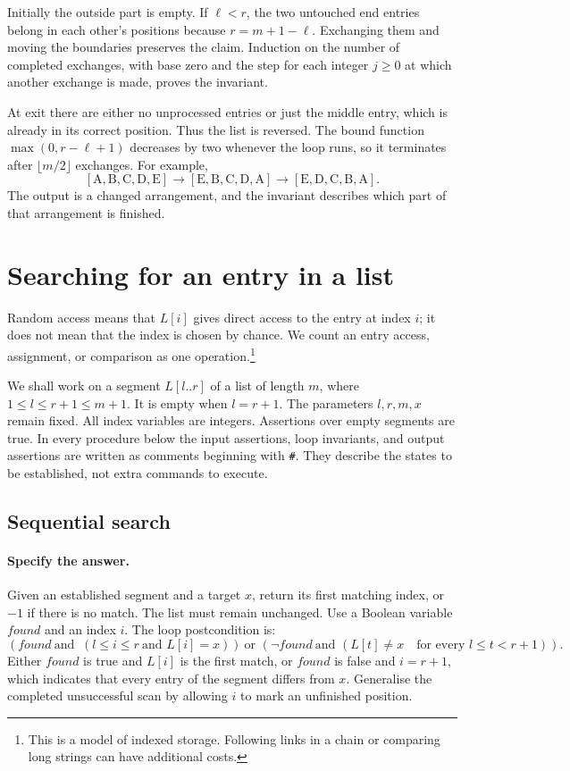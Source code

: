 Initially the outside part is empty. If $\ell<r$, the two untouched
end entries belong in each other's positions because $r=m+1-\ell$.
Exchanging them and moving the boundaries preserves the claim. Induction
on the number of completed exchanges, with base zero and the step for each
integer $j\geq0$ at which another exchange is made, proves the invariant.

At exit there are either no unprocessed entries or just the middle entry,
which is already in its correct position. Thus the list is reversed.
The bound function $\max(0,r-\ell+1)$ decreases by two whenever the loop runs,
so it terminates after $\lfloor m/2\rfloor$ exchanges. For example,
\[
[\mathrm A,\mathrm B,\mathrm C,\mathrm D,\mathrm E]
\longrightarrow[\mathrm E,\mathrm B,\mathrm C,\mathrm D,\mathrm A]
\longrightarrow[\mathrm E,\mathrm D,\mathrm C,\mathrm B,\mathrm A].
\]
The output is a changed arrangement, and the invariant describes which
part of that arrangement is finished.

\section{Searching for an entry in a list}
\label{sec:imp-search}

Random access means that $L[i]$ gives direct access to the entry at index
$i$; it does not mean that the index is chosen by chance. We count an
entry access, assignment, or comparison as one operation.\footnote{This
is a model of indexed storage. Following links in a chain or comparing
long strings can have additional costs.}

We shall work on a segment $L[l..r]$ of a list of length $m$, where
$1\leq l\leq r+1\leq m+1$. It is empty when $l=r+1$.
The parameters $l,r,m,x$ remain
fixed. All index variables are integers. Assertions over empty segments
are true. In every procedure below the input assertions, loop invariants,
and output assertions are written as comments beginning with \texttt{\#}.
They describe the states to be established, not extra commands to execute.

\subsection{Sequential search}
\label{sec:imp-linear-search}

\paragraph{Specify the answer.}
Given an established segment and a target $x$, return its first matching
index, or $-1$ if there is no match. The list must remain unchanged.
Use a Boolean variable $found$ and an index $i$. The loop postcondition
is: 
\[
(found\ \text{and }\ (l\leq i\leq r\ \text{and }L[i]=x))\ \text{or } (\neg found\ \text{and } (L[t]\ne x\quad\text{for every }l\leq t<r+1)).
\]
Either $found$ is true and $L[i]$ is the first match, or $found$ is false and
$i=r+1$, which indicates that every entry of the segment differs from $x$.  Generalise the completed unsuccessful scan by allowing $i$ to
mark an unfinished position.

